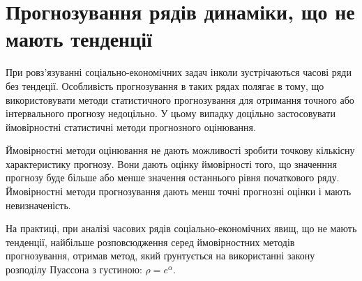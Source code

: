 \documentclass[11pt,a4paper]{article}
\begin{document}
\section*{Прогнозування рядів динаміки, що не мають тенденції}
При ровз'язуванні соціально-економічних задач інколи зустрічаються часові ряди без тендеції. Особливість прогнозування в таких рядах полягає в тому, що використовувати методи статистичного прогнозування для отримання точного або інтервального прогнозу недоцільно. У цьому випадку доцільно застосовувати ймовірностні статистичні методи прогнозного оцінювання.
\par Ймовірностні методи оцінювання не дають можливості зробити точкову кількісну характеристику прогнозу. Вони дають оцінку ймовірності того, що значенння прогнозу буде більше або менше значення останнього рівня початкового ряду. Ймовірностні методи прогнозування дають менш точні прогнозні оцінки і мають невизначеність.
\par На практиці, при аналізі часових рядів соціально-економічних явищ, що не мають тенденції, найбільше розповсюдження серед ймовірностних методів прогнозування, отримав метод, який ґрунтується на використанні закону розподілу Пуассона з густиною: $\rho = e^{\alpha }.$
\end{document}
